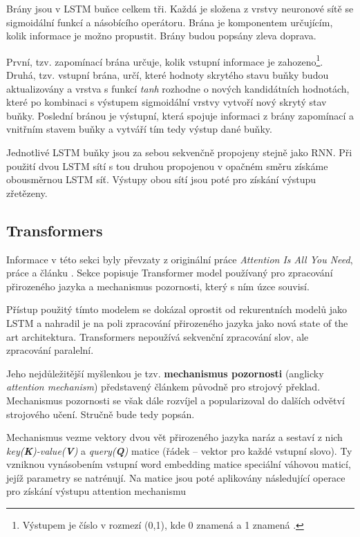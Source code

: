 Brány jsou v LSTM buňce celkem tři. Každá je složena z vrstvy neuronové sítě se sigmoidální funkcí a násobícího operátoru. Brána je komponentem určujícím, kolik informace je možno propustit. Brány budou popsány zleva doprava.\par
První, tzv. zapomínací brána určuje, kolik vstupní informace je zahozeno\footnote{Výstupem je číslo v rozmezí (0,1), kde 0 znamená  a 1 znamená .}. Druhá, tzv. vstupní brána, určí, které hodnoty skrytého stavu buňky budou aktualizovány a vrstva s funkcí \emph{tanh} rozhodne o nových kandidátních hodnotách, které po kombinaci s výstupem sigmoidální vrstvy vytvoří nový skrytý stav buňky. Poslední bránou je výstupní, která spojuje informaci z brány zapomínací a vnitřním stavem buňky a vytváří tím tedy výstup dané buňky.\par
Jednotlivé LSTM buňky jsou za sebou sekvenčně propojeny stejně jako RNN. Při použití dvou LSTM sítí s tou druhou propojenou v opačném směru získáme obousměrnou LSTM síť. Výstupy obou sítí jsou poté pro získání výstupu zřetězeny.

\subsection{Transformers}
\label{transformers}
Informace v této sekci byly převzaty z originální práce \emph{Attention Is All You Need}\cite{Transformers}, práce \cite{attention_mechanism} a článku \cite{Transformers-explained}. Sekce popisuje Transformer model používaný pro zpracování přirozeného jazyka a mechanismus pozornosti, který s ním úzce souvisí.\par
Přístup použitý tímto modelem se dokázal oprostit od rekurentních modelů jako LSTM a nahradil je na poli zpracování přirozeného jazyka jako nová state of the art architektura. Transformers nepoužívá sekvenční zpracování slov, ale zpracování paralelní.\par
Jeho nejdůležitější myšlenkou je tzv. \textbf{mechanismus pozornosti} (anglicky \emph{attention mechanism}) představený článkem \cite{attention_mechanism} původně pro strojový překlad. Mechanismus pozornosti se však dále rozvíjel a popularizoval do dalších odvětví strojového učení. Stručně bude tedy popsán.\par \medskip

Mechanismus vezme vektory dvou vět přirozeného jazyka naráz a sestaví z nich \emph{key(\textbf{K})-value(\textbf{V})} a \emph{query(\textbf{Q})} matice (řádek -- vektor pro každé vstupní slovo). Ty vzniknou vynásobením vstupní word embedding matice speciální váhovou maticí, jejíž parametry se natrénují. Na matice jsou poté aplikovány následující operace pro získání výstupu attention mechanismu

